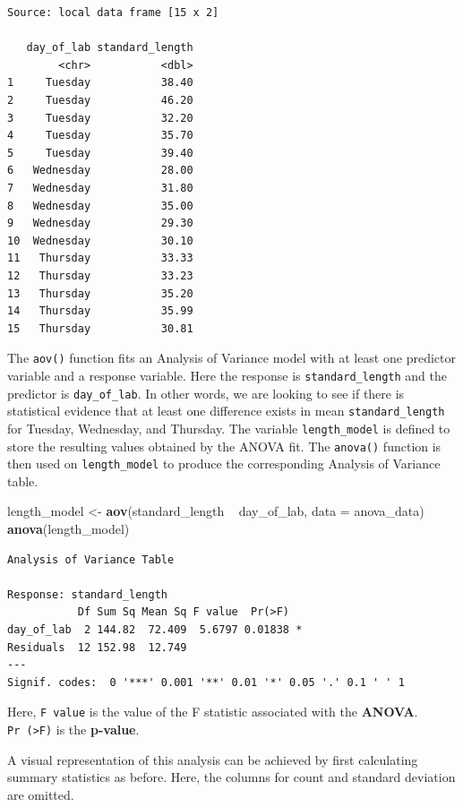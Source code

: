 \documentclass[twoside, 12pt]{article}
\newenvironment{Shaded}{\begin{snugshade}}{\end{snugshade}}
\newcommand{\KeywordTok}[1]{\textcolor[rgb]{0.13,0.29,0.53}{\textbf{{#1}}}}
\newcommand{\DataTypeTok}[1]{\textcolor[rgb]{0.13,0.29,0.53}{{#1}}}
\newcommand{\StringTok}[1]{\textcolor[rgb]{0.31,0.60,0.02}{{#1}}}
\newcommand{\NormalTok}[1]{{#1}}
\begin{document}
\begin{Verbatim}[frame=single]
Source: local data frame [15 x 2]

   day_of_lab standard_length
        <chr>           <dbl>
1     Tuesday           38.40
2     Tuesday           46.20
3     Tuesday           32.20
4     Tuesday           35.70
5     Tuesday           39.40
6   Wednesday           28.00
7   Wednesday           31.80
8   Wednesday           35.00
9   Wednesday           29.30
10  Wednesday           30.10
11   Thursday           33.33
12   Thursday           33.23
13   Thursday           35.20
14   Thursday           35.99
15   Thursday           30.81
\end{Verbatim}

The \texttt{aov()} function fits an Analysis of Variance model with at
least one predictor variable and a response variable. Here the response
is \texttt{standard\_length} and the predictor is \texttt{day\_of\_lab}.
In other words, we are looking to see if there is statistical evidence
that at least one difference exists in mean \texttt{standard\_length}
for Tuesday, Wednesday, and Thursday. The variable
\texttt{length\_model} is defined to store the resulting values obtained
by the ANOVA fit. The \texttt{anova()} function is then used on
\texttt{length\_model} to produce the corresponding Analysis of Variance
table.

\begin{Shaded}
\begin{Highlighting}[]
\NormalTok{length_model <-}\StringTok{  }\KeywordTok{aov}\NormalTok{(standard_length ~}\StringTok{ }\NormalTok{day_of_lab, }\DataTypeTok{data =} \NormalTok{anova_data)}
\KeywordTok{anova}\NormalTok{(length_model)}
\end{Highlighting}
\end{Shaded}

\begin{Verbatim}[frame=single]
Analysis of Variance Table

Response: standard_length
           Df Sum Sq Mean Sq F value  Pr(>F)  
day_of_lab  2 144.82  72.409  5.6797 0.01838 *
Residuals  12 152.98  12.749                  
---
Signif. codes:  0 '***' 0.001 '**' 0.01 '*' 0.05 '.' 0.1 ' ' 1
\end{Verbatim}

Here, \texttt{F\ value} is the value of the F statistic associated with
the \textbf{ANOVA}. \texttt{Pr\ (\textgreater{}F)} is the
\textbf{p-value}.

A visual representation of this analysis can be achieved by first
calculating summary statistics as before. Here, the columns for count
and standard deviation are omitted.
\end{document}
